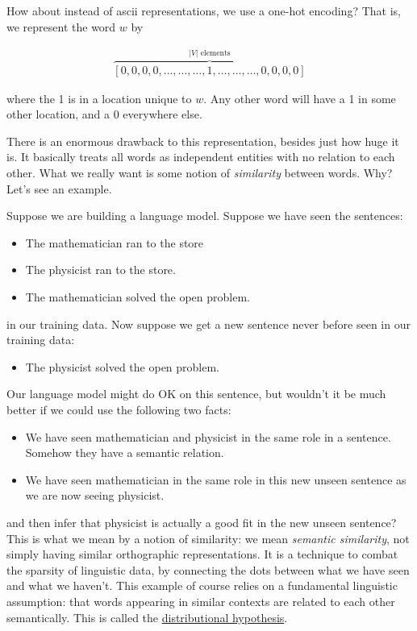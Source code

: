 \documentclass[fleqn,10pt]{SelfArx} %
\begin{document}
How about instead of ascii representations, we use a one-hot encoding?
That is, we represent the word $w$ by

\begin{align} \overbrace{\left[ 0, 0, 0, 0, \dots, \dots, \dots, 1, \dots, \dots, \dots, 0, 0, 0, 0 \right]}^\text{$|V|$ elements} \end{align}

where the 1 is in a location unique to $w$. Any other word will have a 1 in some other location, and a 0 everywhere else.

There is an enormous drawback to this representation, besides just how huge it is. It basically treats all words as independent entities with
no relation to each other. What we really want is some notion of \textit{similarity} between words. Why? Let's see an example.

Suppose we are building a language model. Suppose we have seen the sentences:

\begin{itemize}[noitemsep]
    \item The mathematician ran to the store
    \item The physicist ran to the store.
    \item The mathematician solved the open problem.
\end{itemize}

in our training data. Now suppose we get a new sentence never before seen in our training data:

\begin{itemize}[noitemsep]
    \item The physicist solved the open problem.
\end{itemize}

Our language model might do OK on this sentence, but wouldn't it be much better if we could use the following two facts:

\begin{itemize}[noitemsep]
    \item We have seen  mathematician and physicist in the same role in a sentence. Somehow they have a semantic relation.
    \item We have seen mathematician in the same role  in this new unseen sentence as we are now seeing physicist.
\end{itemize}

and then infer that physicist is actually a good fit in the new unseen sentence? This is what we mean by a notion of similarity: we mean
\textit{semantic similarity}, not simply having similar orthographic representations. It is a technique to combat the sparsity of linguistic
data, by connecting the dots between what we have seen and what we haven't. This example of course relies on a fundamental linguistic assumption: that words appearing in similar contexts are related to each other semantically. This is called the \href{https://en.wikipedia.org/wiki/Distributional_semantics} {distributional hypothesis}.
\end{document}

